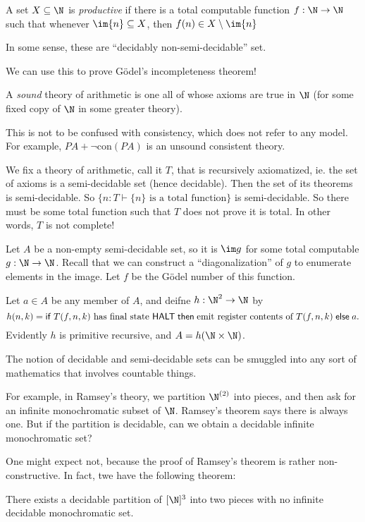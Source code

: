 \documentclass[a4paper]{article}
\newcommand\cif{\mathsf{if}\;}
\newcommand\cthen{\;\mathsf{then}\;}
\newcommand\celse{\;\mathsf{else}\;}
\newcommand\con{\mathrm{con}}
\begin{document}
\begin{defi}
  A set $X \subseteq \N$ is \emph{productive} if there is a total computable function $f: \N \to \N$ such that whenever $\im \{n\} \subseteq X$, then $f(n) \in X \setminus \im \{n\}$
\end{defi}
In some sense, these are ``decidably non-semi-decidable'' set.

We can use this to prove G\"odel's incompleteness theorem!
\begin{defi}
  A \emph{sound} theory of arithmetic is one all of whose axioms are true in $\N$ (for some fixed copy of $\N$ in some greater theory).
\end{defi}
This is not to be confused with consistency, which does not refer to any model. For example, $PA + \neg \con (PA)$ is an unsound consistent theory.

We fix a theory of arithmetic, call it $T$, that is recursively axiomatized, ie. the set of axioms is a semi-decidable set (hence decidable). Then the set of its theorems is semi-decidable. So $\{n: T \vdash \{n\}\text{ is a total function}\}$ is semi-decidable. So there must be some total function such that $T$ does not prove it is total. In other words, $T$ is not complete!


Let $A$ be a non-empty semi-decidable set, so it is $\im g$ for some total computable $g: \N \to \N$. Recall that we can construct a ``diagonalization'' of $g$ to enumerate elements in the image. Let $f$ be the G\"odel number of this function.

Let $a \in A$ be any member of $A$, and deifne $h: \N^2 \to \N$ by
\[
  h(n, k) = \cif T(f, n, k)\text{ has final state \textsf{HALT}} \cthen \text{emit register contents of $T(f, n, k)$} \celse a.
\]
Evidently $h$ is primitive recursive, and $A = h(\N \times \N)$.

The notion of decidable and semi-decidable sets can be smuggled into any sort of mathematics that involves countable things.

For example, in Ramsey's theory, we partition $\N^{(2)}$ into pieces, and then ask for an infinite monochromatic subset of $\N$. Ramsey's theorem says there is always one. But if the partition is decidable, can we obtain a decidable infinite monochromatic set?

One might expect not, because the proof of Ramsey's theorem is rather non-constructive. In fact, twe have the following theorem:
\begin{thm}[Jockusch]
  There exists a decidable partition of $[\N]^3$ into two pieces with no infinite decidable monochromatic set.
\end{thm}
\end{document}
